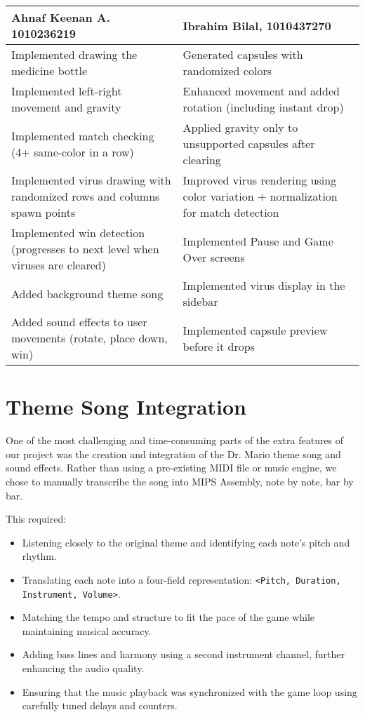\documentclass{article}
\begin{document}
\begin{center}
\renewcommand{\arraystretch}{1.5} 
\begin{tabular}{| p{7cm} | p{7cm} |}
\hline
\textbf{Ahnaf Keenan A. 1010236219} & \textbf{Ibrahim Bilal, 1010437270} \\
\hline
Implemented drawing the medicine bottle & Generated capsules with randomized colors \\
\hline
Implemented left-right movement and gravity & Enhanced movement and added rotation (including instant drop) \\
\hline
Implemented match checking (4+ same-color in a row) & Applied gravity only to unsupported capsules after clearing \\
\hline
Implemented virus drawing with randomized rows and columns spawn points & Improved virus rendering using color variation + normalization for match detection \\
\hline
Implemented win detection (progresses to next level when viruses are cleared) & Implemented Pause and Game Over screens \\
\hline
Added background theme song & Implemented virus display in the sidebar \\
\hline
Added sound effects to user movements (rotate, place down, win) & Implemented capsule preview before it drops \\
\hline
\end{tabular}
\end{center}


\section*{Theme Song Integration}

One of the most challenging and time-consuming parts of the extra features of our project was the creation and integration of the Dr. Mario theme song and sound effects. Rather than using a pre-existing MIDI file or music engine, we chose to manually transcribe the song into MIPS Assembly, note by note, bar by bar.

This required:
\begin{itemize}
    \item Listening closely to the original theme and identifying each note's pitch and rhythm.
    \item Translating each note into a four-field representation: \texttt{<Pitch, Duration, Instrument, Volume>}.
    \item Matching the tempo and structure to fit the pace of the game while maintaining musical accuracy.
    \item Adding bass lines and harmony using a second instrument channel, further enhancing the audio quality.
    \item Ensuring that the music playback was synchronized with the game loop using carefully tuned delays and counters.
\end{itemize}
\end{document}
